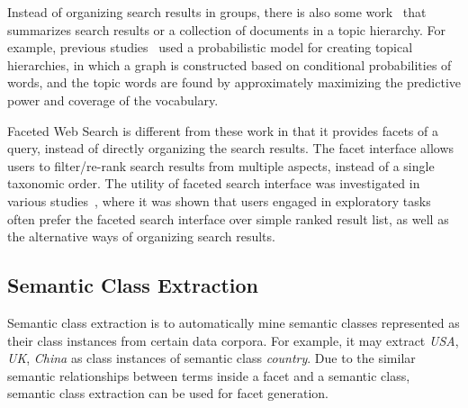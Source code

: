 
Instead of organizing search results in groups, there is also some work~\cite{lawrie2001finding,lawrie2003generating, nevill1999lexically} that summarizes search results or a collection of documents in a topic hierarchy. For example, previous studies~\cite{lawrie2001finding,lawrie2003generating} used a probabilistic model for creating topical hierarchies, in which a graph is constructed based on conditional probabilities of words, and the topic words are found by approximately maximizing the predictive power and coverage of the vocabulary.


Faceted Web Search is different from these work in that it provides facets of a query, instead of directly organizing the search results. The facet interface allows users to filter/re-rank search results from multiple aspects, instead of a single taxonomic order. The utility of faceted search interface was investigated in various studies~\cite{pollitt1998key,hearst2006clustering,pratt1999knowledge,yee2003faceted,kaki2005findex,rodden2001does}, where it was shown that users engaged in exploratory tasks often prefer the faceted search interface over simple ranked result list, as well as the alternative ways of organizing search results.


\subsection{Semantic Class Extraction}
Semantic class extraction is to automatically mine semantic classes represented as their class instances from certain data corpora. For example, it may extract \textit{USA}, \textit{UK}, \textit{China} as class instances of semantic class \textit{country}. Due to the similar semantic relationships between terms inside a facet and a semantic class, semantic class extraction can be used for facet generation. 

